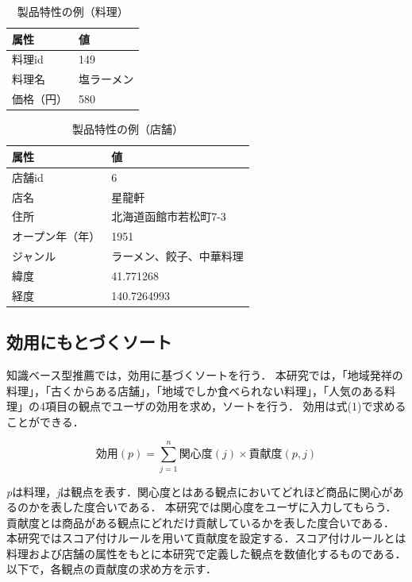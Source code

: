 \documentclass{funthesis}
\begin{document}
\begin{table}[htb]
  \begin{center}
  \scriptsize
    \caption{製品特性の例（料理）}
    \normalsize
    \begin{tabular}{p{6cm}|p{6cm}}
    \hline
属性 & 値 \\ \hline\hline
      料理id & 149\\ \hline
      料理名 & 塩ラーメン \\ \hline
      価格（円） & 580 \\ \hline  \end{tabular}
  \end{center}
  \end{table}
  
\begin{table}[htb]
  \begin{center}
  \scriptsize
    \caption{製品特性の例（店舗）}
    \normalsize
   \begin{tabular}{p{6cm}|p{6cm}}
    \hline
属性 & 値 \\ \hline\hline
      店舗id & 6\\ \hline
      店名 & 星龍軒 \\ \hline
      住所 &  北海道函館市若松町7-3\\ \hline
      オープン年（年）& 1951 \\ \hline
      ジャンル & ラーメン、餃子、中華料理 \\ \hline
      緯度 & 41.771268 \\ \hline
      経度 & 140.7264993 \\ \hline
  \end{tabular}
  \end{center}
\end{table}

\subsection{効用にもとづくソート}
知識ベース型推薦では，効用に基づくソートを行う．
本研究では，「地域発祥の料理」，「古くからある店舗」，「地域でしか食べられない料理」，「人気のある料理」の4項目の観点でユーザの効用を求め，ソートを行う．
効用は式(1)で求めることができる．

\begin{equation}
効用(p)=\sum_{j=1}^{n} 関心度(j)×貢献度(p,j) 
\end{equation}

{\it p}は料理，{\it j}は観点を表す．関心度とはある観点においてどれほど商品に関心があるのかを表した度合いである．
本研究では関心度をユーザに入力してもらう．貢献度とは商品がある観点にどれだけ貢献しているかを表した度合いである．
本研究ではスコア付けルールを用いて貢献度を設定する．スコア付けルールとは料理および店舗の属性をもとに本研究で定義した観点を数値化するものである．
以下で，各観点の貢献度の求め方を示す．
\end{document}
